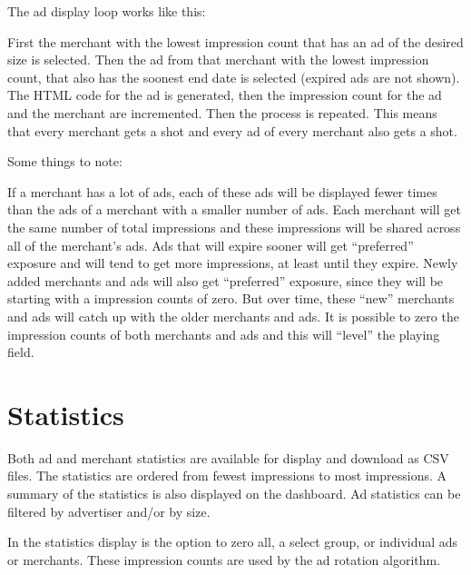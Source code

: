 \documentclass[letterpaper]{article}
\begin{document}
The ad display loop works like this:

First the merchant with the lowest impression count that has an ad of
the desired size is selected.  Then the ad from that merchant with the
lowest impression count, that also has the soonest end date is selected
(expired ads are not shown).  The HTML code for the ad is generated,
then the impression count for the ad and the merchant are incremented.
Then the process is repeated.  This means that every merchant gets a
shot and every ad of every merchant also gets a shot.

Some things to note:

If a merchant has a lot of ads, each of these ads will be displayed
fewer times than the ads of a merchant with a smaller number of ads. 
Each merchant will get the same number of total impressions and these
impressions will be shared across all of the merchant's ads.  Ads that
will expire sooner will get ``preferred'' exposure and will tend to get
more impressions, at least until they expire.  Newly added merchants and
ads will also get ``preferred'' exposure, since they will be starting
with a impression counts of zero.  But over time, these ``new''
merchants and ads will catch up with the older merchants and ads.  It is
possible to zero the impression counts of both merchants and ads and
this will ``level'' the playing field.

\section{Statistics}

Both ad and merchant statistics are available for display and download
as CSV files.  The statistics are ordered from fewest impressions to
most impressions. A summary of the statistics is also displayed on the
dashboard.  Ad statistics can be filtered by advertiser and/or by size.

In the statistics display is the option to zero all, a select group, or
individual ads or merchants. These impression counts are used by the ad
rotation algorithm.
\end{document}
